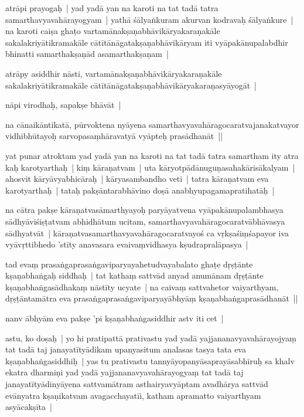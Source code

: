 \documentclass[article,a4paper]{memoir}
\begin{document}
	  \pstart atrā\-pi prayogaḥ | yad yadā\- yan na karoti na tat tadā\- tatra samarthavyavahā\-rayogyam | yathā\- śā\-lyaṅkuram akurvan kodravaḥ śā\-lyaṅkure | na karoti caiṣa ghaṭo vartamā\-nakṣaṇabhā\-vikā\-ryakaraṇakā\-le sakalakriyā\-tikramakā\-le cā\-tī\-tā\-nā\-gatakṣaṇabhā\-vikā\-ryam iti vyā\-pakā\-nupalabdhir bhinatti samarthakṣaṇā\-d asamarthakṣaṇam |
	\pend
      

	  \pstart atrā\-py asiddhir nā\-sti, vartamā\-nakṣaṇabhā\-vikā\-ryakaraṇakā\-le sakalakriyā\-tikramakā\-le cā\-tī\-tā\-nā\-gatakṣaṇabhā\-vikā\-ryakaraṇasyā\-yogā\-t |
	\pend
      

	  \pstart nā\-pi virodhaḥ, sapakṣe bhā\-vā\-t |
	\pend
      

	  \pstart na cā\-naikā\-ntikatā\-, pū\-rvoktena nyā\-yena samarthavyavahā\-ragocaratvajanakatvayor vidhibhū\-tayoḥ sarvopasaṃhā\-ravatyā\- vyā\-pteḥ prasā\-dhanā\-t ||
	\pend
      

	  \pstart yat punar atroktam yad yadā\- yan na karoti na tat tadā\- tatra samartham ity atra kaḥ karotyarthaḥ | kiṃ kā\-raṇatvam | uta kā\-ryotpā\-dā\-nuguṇasahakā\-risā\-kalyam | ahosvit kā\-ryā\-vyabhicā\-raḥ | kā\-ryasambandho veti | tatra kā\-raṇatvam eva karotyarthaḥ | tataḥ pakṣā\-ntarabhā\-vino doṣā\- anabhyupagamapratihatā\-ḥ |
	\pend
      

	  \pstart na cā\-tra pakṣe kā\-raṇatvasā\-marthyayoḥ paryā\-yatvena vyā\-pakā\-nupalambhasya sā\-dhyā\-viśiṣṭatvam abhidhā\-tum ucitam, samarthavyavahā\-ragocaratvā\-bhā\-vasya sā\-dhyatvā\-t | kā\-raṇatvasamarthavyavahā\-ragocaratvayoś ca vṛkṣaśiṃśapayor iva vyā\-vṛttibhedo 'stī\-ty anavasara evaivaṃvidhasya kṣudrapralā\-pasya |
	\pend
      

	  \pstart tad evaṃ prasaṅgaprasaṅgaviparyayahetudvayabalato ghaṭe dṛṣṭā\-nte kṣaṇabhaṅgaḥ siddhaḥ | tat kathaṃ sattvā\-d anyad anumā\-nam dṛṣṭā\-nte kṣaṇabhaṅgasā\-dhakaṃ nā\-stī\-ty ucyate | na caivaṃ sattvahetor vaiyarthyam, dṛṣṭā\-ntamā\-tra eva prasaṅgaprasaṅgaviparyayā\-bhyā\-ṃ kṣaṇabhaṅgaprasā\-dhanā\-t ||
	\pend
      

	  \pstart nanv ā\-bhyā\-m eva pakṣe 'pi kṣaṇabhaṅgasiddhir astv iti cet | 
	\pend
      

	  \pstart astu, ko doṣaḥ | yo hi pratipattā\- prativastu yad yadā\- yajjananavyavahā\-rayojyaṃ tat tadā\- taj janayatī\-tyā\-dikam upanyasitum analasas tasya tata eva kṣaṇabhaṅgasiddhiḥ | yas tu prativastu tannyā\-yopanyā\-saprayā\-sabhī\-ruḥ sa khalv ekatra dharmiṇi yad yadā\- yajjananavyavahā\-rayogyaṃ tat tadā\- taj janayatī\-tyā\-dinyā\-yena sattvamā\-tram asthairyavyā\-ptam avadhā\-rya sattvā\-d evā\-nyatra kṣaṇikatvam avagacchayatī\-i, katham apramatto vaiyarthyam asyā\-cakṣī\-ta |
	\pend
      
\end{document}
